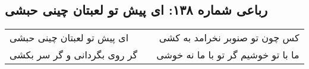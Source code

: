 \begin{center}
\section*{رباعی شماره ۱۳۸: ای پیش تو لعبتان چینی حبشی}
\label{sec:138}
\begin{longtable}{l p{0.5cm} r}
ای پیش تو لعبتان چینی حبشی
&&
کس چون تو صنوبر نخرامد به کشی
\\
گر روی بگردانی و گر سر بکشی
&&
ما با تو خوشیم گر تو با ما نه خوشی
\\
\end{longtable}
\end{center}
